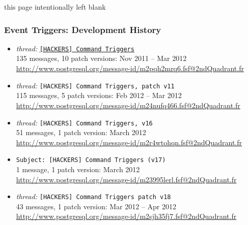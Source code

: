\frame
{

\vfill

this page intentionally left blank

}

\frame
{ \frametitle{Event Triggers: Development History}

\begin{itemize}
\item
\textit{thread:} \href{http://example.com}{\texttt{[HACKERS] Command Triggers}} \\
135 messages, 10 patch versions: Nov 2011 -- Mar 2012 \\
{\tiny \url{http://www.postgresql.org/message-id/m2pqh2mrq6.fsf@2ndQuadrant.fr}}

\item 
\textit{thread:} \texttt{[HACKERS] Command Triggers, patch v11} \\
115 messages, 5 patch versions: Feb 2012 -- Mar 2012  \\
{\tiny \url{http://www.postgresql.org/message-id/m24nufq466.fsf@2ndQuadrant.fr}}

\item 
\textit{thread:} \texttt{[HACKERS] Command Triggers, v16} \\
 51 messages, 1 patch version: March 2012 \\
{\tiny \url{http://www.postgresql.org/message-id/m2r4wtohqn.fsf@2ndQuadrant.fr}}

\item 
\texttt{Subject: [HACKERS] Command Triggers (v17)} \\
1 message, 1 patch version: March 2012 \\
{\tiny \url{http://www.postgresql.org/message-id/m23995lerl.fsf@2ndQuadrant.fr}}

\item 
\textit{thread:} \texttt{[HACKERS] Command Triggers patch v18} \\
43 messages, 1 patch version: Mar 2012 -- Apr 2012 \\
{\tiny \url{http://www.postgresql.org/message-id/m2sjh35fj7.fsf@2ndQuadrant.fr}}
\end{itemize}

}

